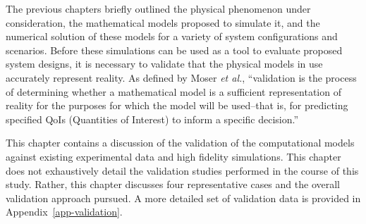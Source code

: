 
\label{sec:validation}

%
%
%

%
%

The previous chapters briefly outlined the physical phenomenon under
consideration, the mathematical models proposed to simulate it,
and the numerical solution of these models for a variety of system 
configurations and scenarios. Before these simulations can be used 
as a tool to evaluate proposed system designs, it is necessary to
validate that the physical models in use accurately represent
reality. As defined by Moser {\em et al.}\cite{Moser2012Validating},
``validation is the process of determining whether a mathematical model
is a sufficient representation of reality for the purposes for which the
model will be used--that is, for predicting specified QoIs (Quantities
of Interest) to inform a specific decision.'' 

This chapter contains a discussion of the validation of the
computational models against existing experimental data and high
fidelity simulations. This chapter does not exhaustively detail the
validation studies performed in the course of this study. Rather, this
chapter discusses four representative cases and the overall validation
approach pursued. A more detailed set of validation data is provided in 
Appendix~\ref{app-validation}. 

